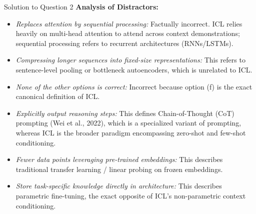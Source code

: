 \documentclass[11pt,a4paper]{article}
\begin{document}
\begin{solutionbox}{Solution to Question 2}
\medskip
\textbf{Analysis of Distractors:}
\begin{itemize}[leftmargin=1.5cm]
    \item[\textbf{(a)}] \textit{Replaces attention by sequential processing:} Factually incorrect. ICL relies heavily on multi-head attention to attend across context demonstrations; sequential processing refers to recurrent architectures (RNNs/LSTMs).
    \item[\textbf{(b)}] \textit{Compressing longer sequences into fixed-size representations:} This refers to sentence-level pooling or bottleneck autoencoders, which is unrelated to ICL.
    \item[\textbf{(c)}] \textit{None of the other options is correct:} Incorrect because option (f) is the exact canonical definition of ICL.
    \item[\textbf{(d)}] \textit{Explicitly output reasoning steps:} This defines Chain-of-Thought (CoT) prompting (Wei et al., 2022), which is a specialized variant of prompting, whereas ICL is the broader paradigm encompassing zero-shot and few-shot conditioning.
    \item[\textbf{(e)}] \textit{Fewer data points leveraging pre-trained embeddings:} This describes traditional transfer learning / linear probing on frozen embeddings.
    \item[\textbf{(g)}] \textit{Store task-specific knowledge directly in architecture:} This describes parametric fine-tuning, the exact opposite of ICL's non-parametric context conditioning.
\end{itemize}
\end{solutionbox}

\bigskip
\end{document}
